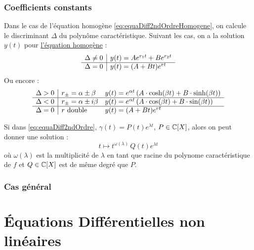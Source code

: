 \documentclass[11pt,a4paper,fleqn,pdftex]{report}
\begin{document}
\subsection{Coefficients constants}
\begin{itheorem}
Dans le cas de l'équation homogène \eqref{eq:equaDiff2ndOrdreHomogene}, on calcule le discriminant $\Delta$ du polynôme caractéristique. Suivant les cas, on a la solution $y(t)$ pour \uline{l'équation homogène} : 
\[
\begin{array}{r | l}
\Delta \neq 0 & y(t) = A e^{r_1t}+B e^{r_2t}\\
\hline
\Delta = 0 & y(t) = (A+Bt)e^{rt}
\end{array}
\]
Ou encore : 
\[
\begin{array}{r | l l}
\Delta > 0 & r_{\pm}=\alpha \pm \beta &y(t) = e^{\alpha t}\left( A\cdot \cosh(\beta t) + B\cdot \sinh (\beta t) \right)
\\
\hline
\Delta < 0 & r_{\pm}=\alpha \pm i\beta &y(t) = e^{\alpha t}\left( A\cdot \cos(\beta t) + B\cdot \sin (\beta t) \right)
\\
\hline
\Delta = 0 & r \text{ double}& y(t) = (A+Bt)e^{rt}
\end{array}
\]
\end{itheorem}
\begin{theorem}
    Si dans \eqref{eq:equaDiff2ndOrdre}, $\gamma (t)= P(t)e^{\lambda t}$, $P\in \mathbb{C} [X]$, alors on peut donner une solution :
    \begin{equation}
    t \mapsto t^{\omega(\lambda)}\, Q(t)e^{\lambda t}
    \end{equation}
    où $\omega(\lambda )$ est la multiplicité de $\lambda$ en tant que racine du polynome caractéristique de $f$ et $Q \in \mathbb{C}[X]$ est de même degré que $P$.
\end{theorem}
\subsection{Cas général}
\chapter{Équations Différentielles non linéaires}
\end{document}

